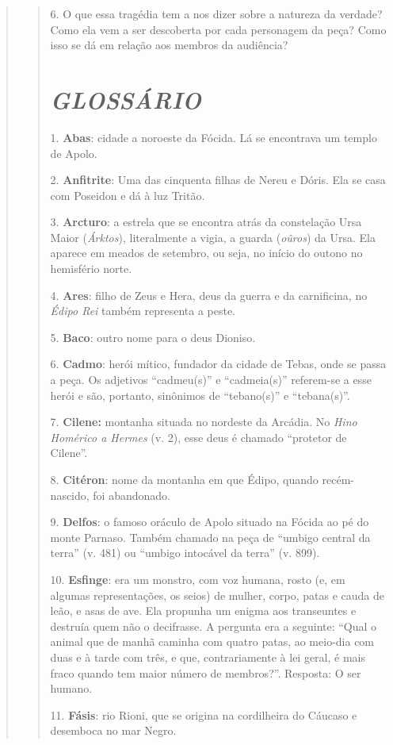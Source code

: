 \begin{verse}
\begin{verse}
6. O que essa tragédia tem a nos dizer sobre a natureza da verdade? Como
ela vem a ser descoberta por cada personagem da peça? Como isso se dá em
relação aos membros da audiência?

\chapter{\emph{GLOSSÁRIO}}

1. \textbf{Abas}: cidade a noroeste da Fócida. Lá se encontrava um
templo de Apolo.

2. \textbf{Anfitrite}: Uma das cinquenta filhas de Nereu e Dóris. Ela se
casa com Poseidon e dá à luz Tritão.

3. \textbf{Arcturo}: a estrela que se encontra atrás da constelação Ursa
Maior (\emph{Árktos}), literalmente a vigia, a guarda (\emph{oûros}) da
Ursa. Ela aparece em meados de setembro, ou seja, no início do outono no
hemisfério norte.

4. \textbf{Ares}: filho de Zeus e Hera, deus da guerra e da carnificina,
no \emph{Édipo Rei} também representa a peste.

5. \textbf{Baco}: outro nome para o deus Dioniso.

6. \textbf{Cadmo}: herói mítico, fundador da cidade de Tebas, onde se
passa a peça. Os adjetivos ``cadmeu(s)'' e ``cadmeia(s)'' referem-se a
esse herói e são, portanto, sinônimos de ``tebano(s)'' e ``tebana(s)''.

7. \textbf{Cilene:} montanha situada no nordeste da Arcádia. No
\emph{Hino Homérico a Hermes} (v. 2), esse deus é chamado ``protetor de
Cilene''.

8. \textbf{Citéron}: nome da montanha em que Édipo, quando
recém-nascido, foi abandonado.

9. \textbf{Delfos}: o famoso oráculo de Apolo situado na Fócida ao pé do
monte Parnaso. Também chamado na peça de ``umbigo central da terra'' (v.
481) ou ``umbigo intocável da terra'' (v. 899).

10. \textbf{Esfinge}: era um monstro, com voz humana, rosto (e, em
algumas representações, os seios) de mulher, corpo, patas e cauda de
leão, e asas de ave. Ela propunha um enigma aos transeuntes e destruía
quem não o decifrasse. A pergunta era a seguinte: ``Qual o animal que de
manhã caminha com quatro patas, ao meio-dia com duas e à tarde com três,
e que, contrariamente à lei geral, é mais fraco quando tem maior número
de membros?''. Resposta: O ser humano.

11. \textbf{Fásis}: rio Rioni, que se origina na cordilheira do Cáucaso
e desemboca no mar Negro.


\end{verse}
\end{verse}
